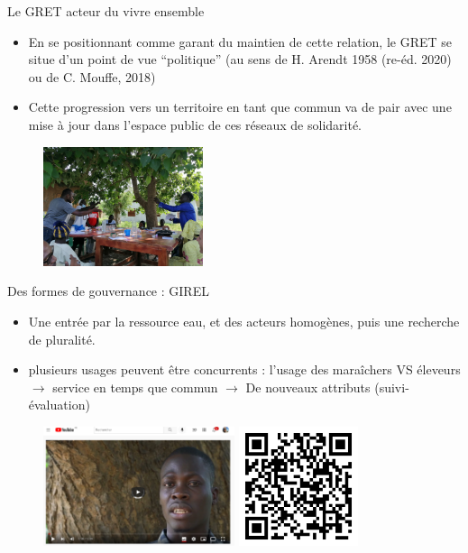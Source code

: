\documentclass[newPxFont]{beamer}
\begin{document}
\begin{frame}[c]{Le GRET acteur du vivre ensemble}
\vspace{-1cm}

\begin{itemize}
    \item En se positionnant comme garant du maintien de cette relation, le GRET se situe d’un point de vue “politique” (au sens de H. Arendt 1958 (re-éd. 2020) ou de C. Mouffe, 2018)
    \item Cette progression vers un territoire en tant que commun va de pair avec une mise à jour dans l’espace public de ces réseaux de solidarité.
\end{itemize}
\begin{figure}
    \includegraphics[height=3.5cm]{img/atelier_montroland.jpg}
\end{figure}
\end{frame}


\begin{frame}[c]{Des formes de gouvernance : GIREL}
\vspace{-1cm}
\begin{itemize}
    \item Une entrée par la ressource eau, et des acteurs homogènes, puis une recherche de pluralité.
    \item plusieurs usages peuvent être concurrents : l’usage des maraîchers VS éleveurs $\rightarrow$ service en temps que commun $\rightarrow$ De nouveaux attributs (suivi-évaluation)
\end{itemize}
\begin{figure}
    \includegraphics[height=3.5cm]{img/ComMod_f'eauDiem.png}
    \includegraphics[height=3.5cm]{img/qrcode_feaudiem.png}
\end{figure}

\end{frame}
\end{document}
